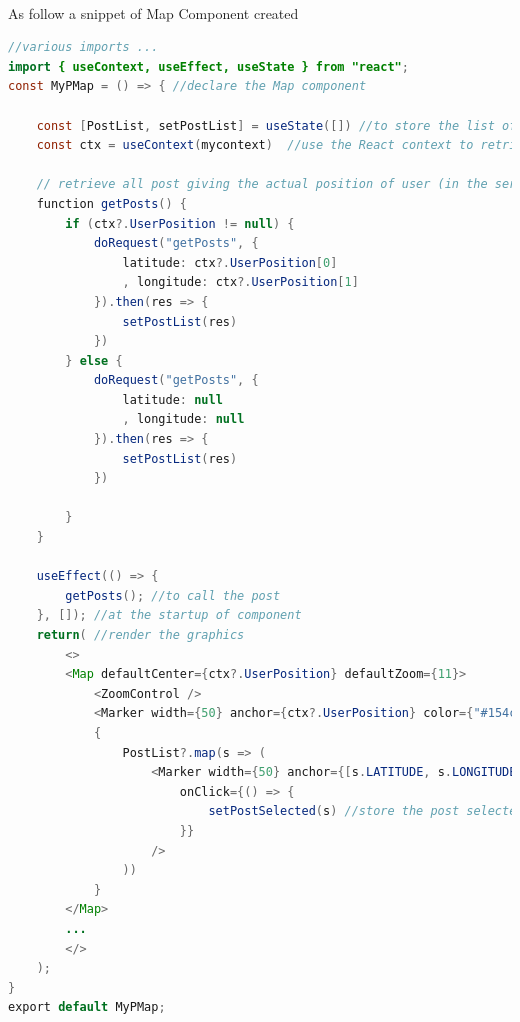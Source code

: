 \documentclass[conference]{IEEEtran}
\begin{document}
\\
As follow a snippet of Map Component created
\begin{lstlisting}[language=Java, caption=Map component snippet]
//various imports ...
import { useContext, useEffect, useState } from "react";
const MyPMap = () => { //declare the Map component

    const [PostList, setPostList] = useState([]) //to store the list of posts
    const ctx = useContext(mycontext)  //use the React context to retrieve data of other components
    
    // retrieve all post giving the actual position of user (in the server it will be computed the nearest posts)
    function getPosts() {
        if (ctx?.UserPosition != null) {
            doRequest("getPosts", {
                latitude: ctx?.UserPosition[0]
                , longitude: ctx?.UserPosition[1]
            }).then(res => {
                setPostList(res)
            })
        } else {
            doRequest("getPosts", {
                latitude: null
                , longitude: null
            }).then(res => {
                setPostList(res)
            })

        }
    }
    
    useEffect(() => {
        getPosts(); //to call the post
    }, []); //at the startup of component
    return( //render the graphics
        <>
        <Map defaultCenter={ctx?.UserPosition} defaultZoom={11}>
            <ZoomControl />
            <Marker width={50} anchor={ctx?.UserPosition} color={"#154c79"} />
            {
                PostList?.map(s => (
                    <Marker width={50} anchor={[s.LATITUDE, s.LONGITUDE]} color={(s?.MEDIATYPE?.length > 0) ? '#d6c531' : '#f23c3c'}
                        onClick={() => {
                            setPostSelected(s) //store the post selected to open it in the opportuned component (viewPost)
                        }}
                    />
                ))
            }
        </Map>
        ...
        </>
    );
}
export default MyPMap;
\end{lstlisting}
\end{document}
